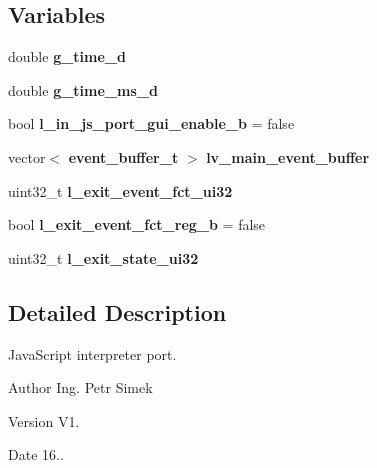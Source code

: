 \subsection*{Variables}
\begin{DoxyCompactItemize}
\item 
double \textbf{ g\+\_\+time\+\_\+d}
\item 
double {\bfseries g\+\_\+time\+\_\+ms\+\_\+d}
\item 
bool \textbf{ l\+\_\+in\+\_\+js\+\_\+port\+\_\+gui\+\_\+enable\+\_\+b} = false
\item 
vector$<$ \textbf{ event\+\_\+buffer\+\_\+t} $>$ {\bfseries lv\+\_\+main\+\_\+event\+\_\+buffer}
\item 
uint32\+\_\+t {\bfseries l\+\_\+exit\+\_\+event\+\_\+fct\+\_\+ui32}
\item 
bool {\bfseries l\+\_\+exit\+\_\+event\+\_\+fct\+\_\+reg\+\_\+b} = false
\item 
uint32\+\_\+t {\bfseries l\+\_\+exit\+\_\+state\+\_\+ui32}
\end{DoxyCompactItemize}


\subsection{Detailed Description}
Java\+Script interpreter port. 

\begin{DoxyAuthor}{Author}
Ing. Petr Simek 
\end{DoxyAuthor}
\begin{DoxyVersion}{Version}
V1. 
\end{DoxyVersion}
\begin{DoxyDate}{Date}
16.. 
\end{DoxyDate}
